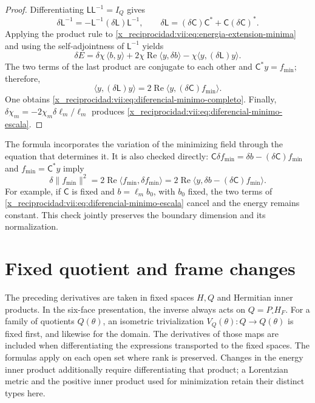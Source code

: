 \begin{proof}
Differentiating \(\mathsf L\mathsf L^{-1}=I_Q\) gives
\[
 \delta\mathsf L^{-1}
 =-\mathsf L^{-1}(\delta\mathsf L)\mathsf L^{-1},\qquad
 \delta\mathsf L=(\delta\mathsf C)\mathsf C^*
                      +\mathsf C(\delta\mathsf C)^*.
\]
Applying the product rule to \eqref{x_reciprocidad:vii:eq:energia-extension-minima} and using the self-adjointness of \(\mathsf L^{-1}\) yields
\[
 \delta E=\delta\chi\,\langle b,y\rangle
 +2\chi\operatorname{Re}\langle y,\delta b\rangle
 -\chi\langle y,(\delta\mathsf L)y\rangle.
\]
The two terms of the last product are conjugate to each other and \(\mathsf C^*y=f_{\min}\); therefore,
\[
 \langle y,(\delta\mathsf L)y\rangle
 =2\operatorname{Re}\langle y,(\delta\mathsf C)f_{\min}\rangle.
\]
One obtains \eqref{x_reciprocidad:vii:eq:diferencial-minimo-completo}. Finally, \(\delta\chi_m=-2\chi_m\delta\ell_m/\ell_m\) produces \eqref{x_reciprocidad:vii:eq:diferencial-minimo-escala}.
\end{proof}

The formula incorporates the variation of the minimizing field through the equation that determines it. It is also checked directly: \(\mathsf C\delta f_{\min}=\delta b-(\delta\mathsf C)f_{\min}\) and \(f_{\min}=\mathsf C^*y\) imply
\[
 \delta\|f_{\min}\|^2
 =2\operatorname{Re}\langle f_{\min},\delta f_{\min}\rangle
 =2\operatorname{Re}
     \langle y,\delta b-(\delta\mathsf C)f_{\min}\rangle.
\]
For example, if \(\mathsf C\) is fixed and \(b=\ell_m b_0\), with \(b_0\) fixed, the two terms of \eqref{x_reciprocidad:vii:eq:diferencial-minimo-escala} cancel and the energy remains constant. This check jointly preserves the boundary dimension and its normalization.

\section{Fixed quotient and frame changes}
\label{x_reciprocidad:vii:subsec:marcos-minimo}

The preceding derivatives are taken in fixed spaces \(H,Q\) and Hermitian
inner products. In the six-face presentation, the inverse always
acts on \(Q=P_\square H_F\). For a family of quotients
\(Q(\theta)\), an isometric trivialization
\(V_Q(\theta):Q\to Q(\theta)\) is fixed first, and likewise for the domain.
The derivatives of those maps are included when differentiating the expressions
transported to the fixed spaces. The formulas apply on each
open set where rank is preserved. Changes in the energy inner product
additionally require differentiating that product; a Lorentzian metric
and the positive inner product used for minimization retain their distinct
types here.

